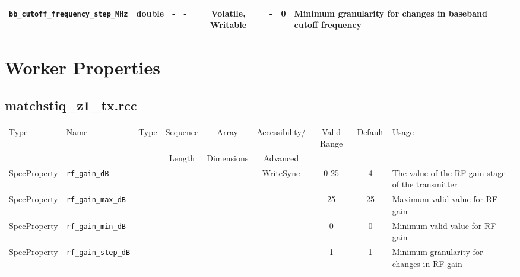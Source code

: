 \documentclass{article}
\def\comp{matchstiq\_z1\_tx}
\begin{document}
\begin{landscape}
\begin{scriptsize}
\begin{tabular}{|p{4cm}|c|c|c|c|c|c|p{8cm}|}
			\hline
			\verb+bb_cutoff_frequency_step_MHz+ & double & -        & -          & Volatile, Writable & -           & 0       & Minimum granularity for changes in baseband cutoff frequency                                                                                \\
			\hline
		\end{tabular}
	\end{scriptsize}

	\section*{Worker Properties}
	\subsection*{\comp.rcc}
	\begin{scriptsize}
		\begin{tabular}{|p{2cm}|p{4cm}|c|c|c|c|c|c|p{6.5cm}|}
			\hline
			\rowcolor{blue}
			Type         & Name                                & Type & Sequence & Array      & Accessibility/ & Valid Range  & Default & Usage                                                                                         \\
			\rowcolor{blue}
			             &                                     &      & Length   & Dimensions & Advanced       &              &         &                                                                                               \\
			\hline
			SpecProperty & \verb+rf_gain_dB+                   & -    & -        & -          & WriteSync      & 0-25         & 4       & The value of the RF gain stage of the transmitter                                             \\
			\hline
			SpecProperty & \verb+rf_gain_max_dB+               & -    & -        & -          & -              & 25           & 25      & Maximum valid value for RF gain                                                               \\
			\hline
			SpecProperty & \verb+rf_gain_min_dB+               & -    & -        & -          & -              & 0            & 0       & Minimum valid value for RF gain                                                               \\
			\hline
			SpecProperty & \verb+rf_gain_step_dB+              & -    & -        & -          & -              & 1            & 1       & Minimum granularity for changes in RF gain                                                    \\

\end{tabular}
\end{scriptsize}
\end{landscape}
\end{document}
